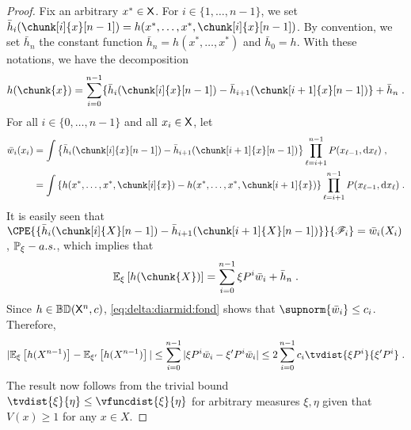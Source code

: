 \documentclass[leqno,11pt,a4paper]{article}
\begin{document}
\begin{proof}
Fix an arbitrary
$x^* \in \mathsf{X}$. For $i \in \{1,\ldots,n-1\}$, we set $\bar{h}_i(\chunk[i]{x}[n-1])=h(x^*,\dots,x^*,\chunk[i]{x}[n-1])$. By convention,
we set $\bar{h}_n$ the constant function $\bar{h}_n=h(x^*,\ldots,x^*)$ and $\bar{h}_0=h$. With these
notations, we have the decomposition
\[
h(\chunk{x})=\sum_{i=0}^{n-1} \{\bar{h}_i(\chunk[i]{x}[n-1]) - \bar{h}_{i+1}(\chunk[i+1]{x}[n-1]) \} +\bar{h}_n \eqsp.
\]
For all $i \in \{0,\ldots,n-1\}$ and all $x_i \in \mathsf{X}$, let
\begin{align}
\bar{w}_i(x_i)&=\int \lrcb{\bar{h}_i(\chunk[i]{x}[n-1])-\bar{h}_{i+1}(\chunk[i+1]{x}[n-1])}  \prod_{\ell=i+1}^{n-1} P(x_{\ell-1}, \rmd x_{\ell})\eqsp, \nonumber \\
&=\int \lrcb{h(x^*,\ldots,x^*,\chunk[i]{x})-h(x^*,\ldots,x^*,\chunk[i+1]{x})}  \prod_{\ell=i+1}^{n-1} P(x_{\ell-1}, \rmd x_{\ell}) \eqsp. \label{eq:delta:diarmid:fond}
\end{align}
It is easily seen that $\CPE{\{\bar{h}_i(\chunk[i]{X}[n-1])-\bar{h}_{i+1}(\chunk[i+1]{X}[n-1])\}}{\cF_{i}}=\bar{w}_i(X_i)$, $\mathbb{P}_\xi-a.s.$,  which implies that
\[
\Ebb_\xi \lrb{h(\chunk{X})}=\sum_{i=0}^{n-1} \xi P^i \bar{w}_i + \bar{h}_n \eqsp.
\]
Since  $h \in\mathbb{BD}(\mathsf{X}^n,c)$, \eqref{eq:delta:diarmid:fond} shows that  $\supnorm{\bar{w}_i} \leq c_i$.
Therefore,
\[
|\Ebb_\xi \lrb{h(X^{n-1})}-\Ebb_{\xi'} \lrb{h(X^{n-1})} |\\
\leq \sum_{i=0}^{n-1} |\xi P^i \bar{w}_i-\xi' P^i \bar{w}_i| \leq 2 \sum_{i=0}^{n-1} c_{i}\tvdist{\xi P^{i}}{\xi' P^{i}} \eqsp.
\]
The result now follows from the trivial bound $\tvdist{\xi}{\eta} \leq \vfuncdist{\xi}{\eta}$ for arbitrary measures $\xi,\eta$ given that $V(x) \geq 1$ for any $x \in X$.
\end{proof}
\end{document}
